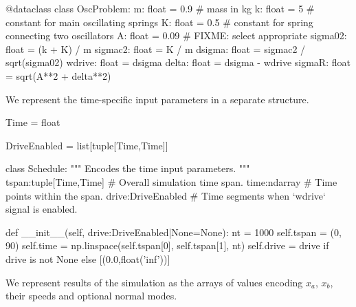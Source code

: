   \begin{python}
  @dataclass
  class OscProblem:
    m:       float = 0.9   # mass in kg
    k:       float = 5     # constant for main oscillating springs
    K:       float = 0.5   # constant for spring connecting two oscillators
    A:       float = 0.09  # FIXME: select appropriate
    sigma02: float = (k + K) / m
    sigmac2: float = K / m
    dsigma:  float = sigmac2 / sqrt(sigma02)
    wdrive:  float = dsigma
    delta:   float = dsigma - wdrive
    sigmaR:  float = sqrt(A**2 + delta**2)
  \end{python}


We represent the time-specific input parameters in a separate structure.

  \begin{python}
  Time = float
  
  DriveEnabled = list[tuple[Time,Time]]
  
  class Schedule:
    """ Encodes the time input parameters. """
    tspan:tuple[Time,Time]   # Overall simulation time span.
    time:ndarray             # Time points within the span.
    drive:DriveEnabled       # Time segments when `wdrive` signal is enabled.
  
    def __init__(self, drive:DriveEnabled|None=None):
      nt = 1000
      self.tspan = (0, 90)
      self.time = np.linspace(self.tspan[0], self.tspan[1], nt)
      self.drive = drive if drive is not None else [(0.0,float('inf'))]
  \end{python}


We represent results of the simulation as the arrays of values encoding $x_a$, $x_b$, their
speeds and optional normal modes.


  \begin{comment}
    \begin{sh}
    printf '\\begin{%
    cat $PROJECT_ROOT/python/mechanical_bloch.py | sedlines.sh Simulation
    printf '\\end{%
    \end{sh}
  \end{comment}


